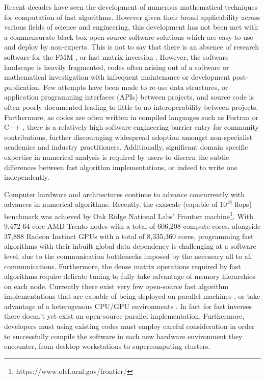 Recent decades have seen the development of numerous mathematical techniques for computation of fast algorithms. However given their broad applicability across various fields of science and engineering, this development has not been met with a commensurate black box open-source software solutions which are easy to use and deploy by non-experts. This is not to say that there is an absence of research software for the FMM \cite{kailasa2022pyexafmm, exafmm,wang2021exafmm,malhotra2015pvfmm, fmm3d}, or fast matrix inversion \cite{fmm3dbie, strongskel, ho2020flam}. However, the software landscape is heavily fragmented, codes often arising out of a software or mathematical investigation with infrequent maintenance or development post-publication. Few attempts have been made to re-use data structures, or application programming interfaces (\gls{API}s) between projects, and source code is often poorly documented leading to little to no interoperability between projects. Furthermore, as codes are often written in compiled languages such as Fortran \cite{fmm3d} or C++ \cite{malhotra2015pvfmm, exafmm,wang2021exafmm}, there is a relatively high software engineering barrier entry for community contributions, further discouraging widespread adoption amongst non-specialist academics and industry practitioners. Additionally, significant domain specific expertise in numerical analysis is required by users to discern the subtle differences between fast algorithm implementations, or indeed to write one independently. 

Computer hardware and architectures continue to advance concurrently with advances in numerical algorithms. Recently, the exascale (capable of $10^{18}$ \gls{flops}) benchmark was achieved by Oak Ridge National Labs' Frontier machine\footnote{https://www.olcf.ornl.gov/frontier/}. With  9,472 64 core AMD Trento nodes with a total of 606,208 compute cores, alongside 37,888 Radeon Instinct GPUs with a total of 8,335,360 cores, programming fast algorithms with their inbuilt global data dependency is challenging at a software level, due to the communication bottlenecks imposed by the necessary all to all communications. Furthermore, the dense matrix operations required by fast algorithms require delicate tuning to fully take advantage of memory hierarchies on each node. Currently there exist very few open-source fast algorithm implementations that are capable of being deployed on parallel machines \cite{malhotra2015pvfmm, exafmm}, or take advantage of a heterogenous CPU/GPU environments \cite{exafmm}. In fact for fast inverses there doesn't yet exist an open-source parallel implementation. Furthermore, developers must using existing codes must employ careful consideration in order to successfully compile the software in each new hardware environment they encounter, from desktop workstations to supercomputing clusters.

